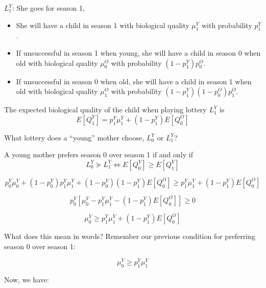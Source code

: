 \documentclass[a4paper, 11 pt]{article}
\theoremstyle{plain}
\begin{document}
\begin{spacing}{1.2}
$L_1^{Y}$: She goes for season 1,
\begin{itemize}
  \item She will have a child in season 1 with biological quality $\mu_1^{Y}$ with probability $p_1^{Y}$.
  \item If unsuccessful in season 1 when young, she will have a child in season 0 when old with biological quality $\mu_0^{O}$ with probability $(1-p_1^{Y})p_0^{O}$.
  \item If unsuccessful in season 0 when old, she will have a child in season 1 when old with biological quality $\mu_1^{O}$ with probability $(1-p_1^{Y})(1-p_0^{O})p_1^{O}$.
\end{itemize}
The expected biological quality of the child when playing lottery $L_1^{Y}$  is
\begin{equation}\label{A9}
    E[Q_1^{Y}]=p_1^{Y} \mu_1^{Y} + (1-p_1^{Y})E[Q_0^{O}]
\end{equation}

What lottery does a ``young'' mother choose, $L_0^{Y}$ or $L_1^{Y}$?

A young mother prefers season 0 over season 1 if and only if
\begin{equation}\label{A10}
    L_0^{Y} \succeq L_1^{Y} \Leftrightarrow E[Q_0^{Y}] \geq E[Q_1^{Y}]
\end{equation}

\begin{equation}\label{A11}
     p_0^{Y} \mu_0^{Y} + (1 - p_0^{Y})p_1^{Y} \mu_1^{Y} + (1 - p_0^{Y})(1-p_1^{Y})E[Q_0^{O}] \geq p_1^{Y} \mu_1^{Y} + (1-p_1^{Y})E[Q_0^{O}]
\end{equation}


\begin{equation}\label{A12}
     p_0^{Y} [ \mu_0^{Y} - p_1^{Y} \mu_1^{Y}-(1-p_1^{Y})E[Q_0^{O}]] \geq 0
\end{equation}


\begin{equation}\label{A13}
     \mu_0^{Y}  \geq  p_1^{Y} \mu_1^{Y} + (1-p_1^{Y})E[Q_0^{O}]
\end{equation}

\clearpage

What does this mean in words? Remember our previous condition for preferring season 0 over season 1:


\begin{equation}\label{A14}
     \mu_0^{Y}  \geq p_1^{Y} \mu_1^{Y}
\end{equation}

Now, we have:


\end{spacing}
\end{document}
